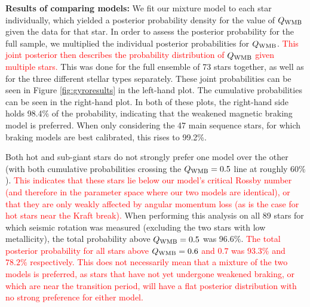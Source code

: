 \documentclass[12pt]{article}
\newcommand{\rtwo}[1]{\textcolor{red}{{#1}}}
\begin{document}
\textbf{Results of comparing models:} We fit our mixture model to each star individually, which yielded a posterior probability density for the value of $Q_{\rm WMB}$ given the data for that star. In order to assess the posterior probability for the full sample, we multiplied the individual posterior probabilities for $Q_{\rm{WMB}}$. \rtwo{This joint posterior then describes the probability distribution of $Q_{\rm WMB}$ given multiple stars.} This was done for the full ensemble of 73 stars together, as well as for the three different stellar types separately. These joint probabilities can be seen in Figure \ref{fig:gyroresults} in the left-hand plot. The cumulative probabilities can be seen in the right-hand plot. In both of these plots, the right-hand side holds 98.4\% of the probability, indicating that the weakened magnetic braking model is preferred. When only considering the 47 main sequence stars, for which braking models are best calibrated, this rises to 99.2\%. 

Both hot and sub-giant stars do not strongly prefer one model over the other (with both cumulative probabilities crossing the $Q_{\rm{WMB}} = 0.5$ line at roughly $60\%$). \rtwo{This indicates that these stars lie below our model's critical Rossby number (and therefore in the parameter space where our two models are identical), or that they are only weakly affected by angular momentum loss (as is the case for hot stars near the Kraft break).} When performing this analysis on all 89 stars for which seismic rotation was measured (excluding the two stars with low metallicity), the total probability above $Q_{\rm{WMB}} = 0.5$ was 96.6\%. \rtwo{The total posterior probability for all stars above $Q_{\rm{WMB}} = 0.6$ and $0.7$ was $93.3\%$ and $78.2\%$  respectively. This does not necessarily mean that a mixture of the two models is preferred, as stars that have not yet undergone weakened braking, or which are near the transition period, will have a flat posterior distribution with no strong preference for either model.}\\
\end{document}
